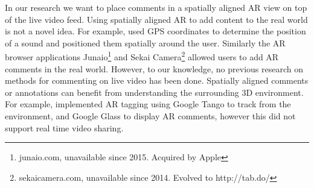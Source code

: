 
 




In our research we want to place comments in a spatially aligned AR view on top of the live video feed. Using spatially aligned AR to add content to the real world is not a novel idea. For example, \cite{Langlotz2013} used GPS coordinates to determine the position of a sound and positioned them spatially around the user. Similarly the AR browser applications Junaio\footnote{junaio.com, unavailable since 2015. Acquired by Apple} and Sekai Camera\footnote{sekaicamera.com, unavailable since 2014. Evolved to http://tab.do/} allowed users to add AR comments in the real world. However, to our knowledge, no previous research on methods for commenting on live video has been done. Spatially aligned comments or annotations can benefit from understanding the surrounding 3D environment. For example, \cite{Nassani2015} implemented AR tagging using Google Tango to track from the environment, and Google Glass to display AR comments, however this did not support real time video sharing. 


